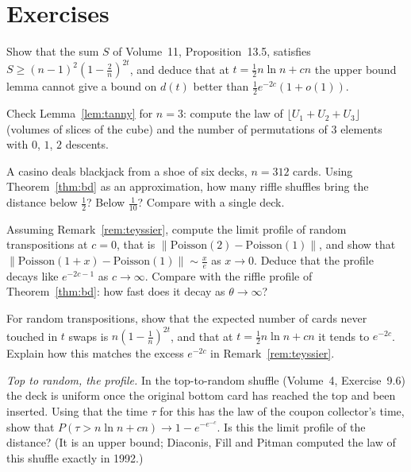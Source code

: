 \section{Exercises}

\begin{exercise}[$\star$]\label{ex:lemmalimit}
Show that the sum $S$ of Volume~11, Proposition~13.5, satisfies $S\ge(n-1)^2(1-\frac2n)^{2t}$, and deduce that at $t=\frac12n\ln n+cn$ the upper bound lemma cannot give a bound on $d(t)$
better than $\frac12e^{-2c}(1+o(1))$.
\end{exercise}

\begin{exercise}[$\star$]\label{ex:tannysmall}
Check Lemma~\ref{lem:tanny} for $n=3$: compute the law of $\lfloor U_1+U_2+U_3\rfloor$ (volumes of slices of the cube) and the number of permutations of $3$ elements with $0$, $1$, $2$ descents.
\end{exercise}

\begin{exercise}[$\star\star$]\label{ex:shoe}
A casino deals blackjack from a shoe of six decks, $n=312$ cards. Using Theorem~\ref{thm:bd} as an approximation, how many riffle shuffles bring the distance below
$\frac12$? Below $\frac1{10}$? Compare with a single deck.
\end{exercise}

\begin{exercise}[$\star\star$]\label{ex:profile}
Assuming Remark~\ref{rem:teyssier}, compute the limit profile of random transpositions at $c=0$, that is $\|\mathrm{Poisson}(2)-\mathrm{Poisson}(1)\|$, and show that
$\|\mathrm{Poisson}(1+x)-\mathrm{Poisson}(1)\|\sim\frac x{e}$ as $x\to0$. Deduce that the profile decays like $e^{-2c-1}$ as $c\to\infty$. Compare with the riffle profile of Theorem~\ref{thm:bd}: how fast does
it decay as $\theta\to\infty$?
\end{exercise}

\begin{exercise}[$\star\star$]\label{ex:untouched}
For random transpositions, show that the expected number of cards never touched in $t$ swaps is $n(1-\frac1n)^{2t}$, and that at $t=\frac12n\ln n+cn$ it tends to $e^{-2c}$. Explain how this
matches the excess $e^{-2c}$ in Remark~\ref{rem:teyssier}.
\end{exercise}

\begin{exercise}[$\star\star\star$]\label{ex:topinsert}
\emph{Top to random, the profile.} In the top-to-random shuffle (Volume~4, Exercise~9.6) the deck is uniform once the original bottom card has reached the top and been
inserted. Using that the time $\tau$ for this has the law of the coupon collector's time, show that $P(\tau>n\ln n+cn)\to1-e^{-e^{-c}}$. Is this the limit profile of the distance?
(It is an upper bound; Diaconis, Fill and Pitman computed the law of this shuffle exactly in 1992.)
\end{exercise}

